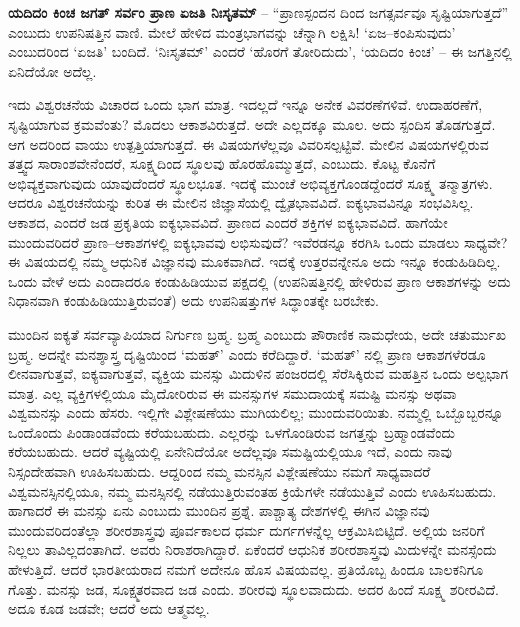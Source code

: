\textbf{ಯದಿದಂ ಕಿಂಚ ಜಗತ್​ ಸರ್ವಂ ಪ್ರಾಣ ಏಜತಿ ನಿಃಸೃತಮ್​} – “ಪ್ರಾಣಸ್ಪಂದನ ದಿಂದ ಜಗತ್ಸರ್ವವೂ ಸೃಷ್ಟಿಯಾಗುತ್ತದೆ” ಎಂಬುದು ಉಪನಿಷತ್ತಿನ ವಾಣಿ. ಮೇಲೆ ಹೇಳಿದ ಮಂತ್ರಭಾಗವನ್ನು ಚೆನ್ನಾಗಿ ಲಕ್ಷಿಸಿ! ‘ಏಜ–ಕಂಪಿಸುವುದು’ ಎಂಬುದರಿಂದ ‘ಏಜತಿ’ ಬಂದಿದೆ. ‘ನಿಃಸೃತಮ್​’ ಎಂದರೆ ‘ಹೊರಗೆ ತೋರಿದುದು’, ‘ಯದಿದಂ ಕಿಂಚ’ – ಈ ಜಗತ್ತಿನಲ್ಲಿ ಏನಿದೆಯೋ ಅದೆಲ್ಲ.

ಇದು ವಿಶ್ವರಚನೆಯ ವಿಚಾರದ ಒಂದು ಭಾಗ ಮಾತ್ರ. ಇದಲ್ಲದೆ ಇನ್ನೂ ಅನೇಕ ವಿವರಣೆಗಳಿವೆ. ಉದಾಹರಣೆಗೆ, ಸೃಷ್ಟಿಯಾಗುವ ಕ್ರಮವೆಂತು? ಮೊದಲು ಆಕಾಶವಿರುತ್ತದೆ. ಅದೇ ಎಲ್ಲದಕ್ಕೂ ಮೂಲ. ಅದು ಸ್ಪಂದಿಸ ತೊಡಗುತ್ತದೆ. ಆಗ ಅದರಿಂದ ವಾಯು ಉತ್ಪತ್ತಿಯಾಗುತ್ತದೆ. ಈ ವಿಷಯಗಳೆಲ್ಲವೂ ವಿವರಿಸಲ್ಪಟ್ಟಿವೆ. ಮೇಲಿನ ವಿಷಯಗಳಲ್ಲಿರುವ ತತ್ತ್ವದ ಸಾರಾಂಶವೇನೆಂದರೆ, ಸೂಕ್ಷ್ಮದಿಂದ ಸ್ಥೂಲವು ಹೊರಹೊಮ್ಮುತ್ತದೆ, ಎಂಬುದು. ಕೊಟ್ಟ ಕೊನೆಗೆ ಅಭಿವ್ಯಕ್ತವಾಗುವುದು ಯಾವುದೆಂದರೆ ಸ್ಥೂಲಭೂತ. ಇದಕ್ಕೆ ಮುಂಚೆ ಅಭಿವ್ಯಕ್ತಗೊಂಡದ್ದೆಂದರೆ ಸೂಕ್ಷ್ಮ ತನ್ಮಾತ್ರಗಳು. ಆದರೂ ವಿಶ್ವರಚನೆಯನ್ನು ಕುರಿತ ಈ ಮೇಲಿನ ಜಿಜ್ಞಾಸೆಯಲ್ಲಿ ದ್ವೈತಭಾವವಿದೆ. ಐಕ್ಯಭಾವವಿನ್ನೂ ಸಂಭವಿಸಿಲ್ಲ. ಆಕಾಶದ, ಎಂದರೆ ಜಡ ಪ್ರಕೃತಿಯ ಐಕ್ಯಭಾವವಿದೆ. ಪ್ರಾಣದ ಎಂದರೆ ಶಕ್ತಿಗಳ ಐಕ್ಯಭಾವವಿದೆ. ಹಾಗೆಯೇ ಮುಂದುವರಿದರೆ ಪ್ರಾಣ–ಆಕಾಶಗಳಲ್ಲಿ ಐಕ್ಯಭಾವವು ಲಭಿಸುವುದೆ? ಇವೆರಡನ್ನೂ ಕರಗಿಸಿ ಒಂದು ಮಾಡಲು ಸಾಧ್ಯವೇ? ಈ ವಿಷಯದಲ್ಲಿ ನಮ್ಮ ಆಧುನಿಕ ವಿಜ್ಞಾನವು ಮೂಕವಾಗಿದೆ. ಇದಕ್ಕೆ ಉತ್ತರವನ್ನೇನೂ ಅದು ಇನ್ನೂ ಕಂಡುಹಿಡಿದಿಲ್ಲ. ಒಂದು ವೇಳೆ ಅದು ಎಂದಾದರೂ ಕಂಡುಹಿಡಿಯುವ ಪಕ್ಷದಲ್ಲಿ (ಉಪನಿಷತ್ತಿನಲ್ಲಿ ಹೇಳಿರುವ ಪ್ರಾಣ ಆಕಾಶಗಳನ್ನು ಅದು ನಿಧಾನವಾಗಿ ಕಂಡುಹಿಡಿಯುತ್ತಿರುವಂತೆ) ಅದು ಉಪನಿಷತ್ತುಗಳ ಸಿದ್ಧಾಂತಕ್ಕೇ ಬರಬೇಕು.

ಮುಂದಿನ ಐಕ್ಯತೆ ಸರ್ವವ್ಯಾಪಿಯಾದ ನಿರ್ಗುಣ ಬ್ರಹ್ಮ. ಬ್ರಹ್ಮ ಎಂಬುದು ಪೌರಾಣಿಕ ನಾಮಧೇಯ, ಅದೇ ಚತುರ್ಮುಖ ಬ್ರಹ್ಮ. ಅದನ್ನೇ ಮನಶ್ಶಾಸ್ತ್ರ ದೃಷ್ಟಿಯಿಂದ ‘ಮಹತ್​’ ಎಂದು ಕರೆದಿದ್ದಾರೆ. ‘ಮಹತ್​’ ನಲ್ಲಿ ಪ್ರಾಣ ಆಕಾಶಗಳೆರಡೂ ಲೀನವಾಗುತ್ತವೆ, ಐಕ್ಯವಾಗುತ್ತವೆ, ವ್ಯಕ್ತಿಯ ಮನಸ್ಸು ಮಿದುಳಿನ ಪಂಜರದಲ್ಲಿ ಸೆರೆಸಿಕ್ಕಿರುವ ಮಹತ್ತಿನ ಒಂದು ಅಲ್ಪಭಾಗ ಮಾತ್ರ. ಎಲ್ಲ ವ್ಯಕ್ತಿಗಳಲ್ಲಿಯೂ ಮೈದೋರಿರುವ ಈ ಮನಸ್ಸುಗಳ ಸಮುದಾಯಕ್ಕೆ ಸಮಷ್ಟಿ ಮನಸ್ಸು ಅಥವಾ ವಿಶ್ವಮನಸ್ಸು ಎಂದು ಹೆಸರು. ಇಲ್ಲಿಗೇ ವಿಶ್ಲೇಷಣೆಯು ಮುಗಿಯಲಿಲ್ಲ; ಮುಂದುವರಿಯಿತು. ನಮ್ಮಲ್ಲಿ ಒಬ್ಬೊಬ್ಬರನ್ನೂ ಒಂದೊಂದು ಪಿಂಡಾಂಡವೆಂದು ಕರೆಯಬಹುದು. ಎಲ್ಲರನ್ನು ಒಳಗೊಂಡಿರುವ ಜಗತ್ತನ್ನು ಬ್ರಹ್ಮಾಂಡವೆಂದು ಕರೆಯಬಹುದು. ಆದರೆ ವ್ಯಷ್ಟಿಯಲ್ಲಿ ಏನೇನಿದೆಯೋ ಅದೆಲ್ಲವೂ ಸಮಷ್ಟಿಯಲ್ಲಿಯೂ ಇದೆ, ಎಂದು ನಾವು ನಿಸ್ಸಂದೇಹವಾಗಿ ಊಹಿಸಬಹುದು. ಆದ್ದರಿಂದ ನಮ್ಮ ಮನಸ್ಸಿನ ವಿಶ್ಲೇಷಣೆಯು ನಮಗೆ ಸಾಧ್ಯವಾದರೆ ವಿಶ್ವಮನಸ್ಸಿನಲ್ಲಿಯೂ, ನಮ್ಮ ಮನಸ್ಸಿನಲ್ಲಿ ನಡೆಯುತ್ತಿರುವಂತಹ ಕ್ರಿಯೆಗಳೇ ನಡೆಯುತ್ತಿವೆ ಎಂದು ಊಹಿಸಬಹುದು. ಹಾಗಾದರೆ ಈ ಮನಸ್ಸು ಏನು ಎಂಬುದು ಮುಂದಿನ ಪ್ರಶ್ನೆ. ಪಾಶ್ಚಾತ್ಯ ದೇಶಗಳಲ್ಲಿ ಈಗಿನ ವಿಜ್ಞಾನವು ಮುಂದುವರಿದಂತೆಲ್ಲಾ ಶರೀರಶಾಸ್ತ್ರವು ಪೂರ್ವಕಾಲದ ಧರ್ಮ ದುರ್ಗಗಳನ್ನೆಲ್ಲ ಆಕ್ರಮಿಸಿಬಿಟ್ಟಿದೆ. ಅಲ್ಲಿಯ ಜನರಿಗೆ ನಿಲ್ಲಲು ತಾವಿಲ್ಲದಂತಾಗಿದೆ. ಅವರು ನಿರಾಶರಾಗಿದ್ದಾರೆ. ಏಕೆಂದರೆ ಆಧುನಿಕ ಶರೀರಶಾಸ್ತ್ರವು ಮಿದುಳನ್ನೇ ಮನಸ್ಸೆಂದು ಹೇಳುತ್ತಿದೆ. ಆದರೆ ಭಾರತೀಯರಾದ ನಮಗೆ ಅದೇನೂ ಹೊಸ ವಿಷಯವಲ್ಲ. ಪ್ರತಿಯೊಬ್ಬ ಹಿಂದೂ ಬಾಲಕನಿಗೂ ಗೊತ್ತು. ಮನಸ್ಸು ಜಡ, ಸೂಕ್ಷ್ಮತರವಾದ ಜಡ ಎಂದು. ಶರೀರವು ಸ್ಥೂಲವಾದುದು. ಅದರ ಹಿಂದೆ ಸೂಕ್ಷ್ಮ ಶರೀರವಿದೆ. ಅದೂ ಕೂಡ ಜಡವೇ; ಆದರೆ ಅದು ಆತ್ಮವಲ್ಲ.

